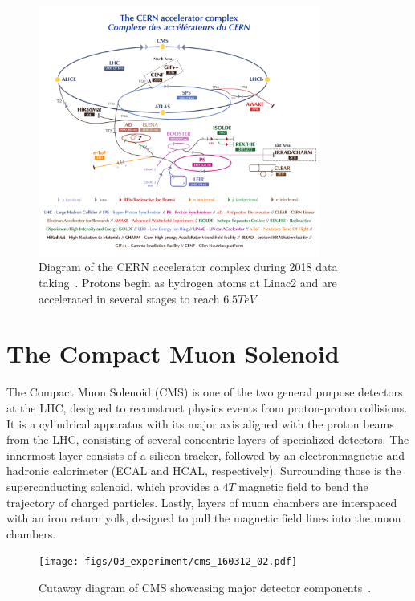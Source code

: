\begin{figure}[htbp]
	\centering
	\includegraphics[width=0.825\textwidth]{figs/03_experiment/CCC-v2018-print-v2.pdf}
	\caption[Diagram of the CERN accelerator complex during 2018 data taking. Protons begin as hydrogen atoms at Linac2 and collide at various detectors along the LHC at $\sqrt{s}=13\unit{TeV}$]
	{Diagram of the CERN accelerator complex during 2018 data taking~\cite{Mobs:2636343}. Protons begin as hydrogen atoms at Linac2 and are accelerated in several stages to reach $6.5\unit{TeV}$} 
	\label{fig:LHC}
\end{figure}

\section{The Compact Muon Solenoid} \label{sec:CMS}
The Compact Muon Solenoid (CMS) is one of the two general purpose detectors at the LHC, designed to reconstruct physics events from proton-proton collisions. It is a cylindrical apparatus with its major axis aligned with the proton beams from the LHC, consisting of several concentric layers of specialized detectors. The innermost layer consists of a silicon tracker, followed by an electronmagnetic and hadronic calorimeter (ECAL and HCAL, respectively). Surrounding those is the superconducting solenoid, which provides a $4\unit{T}$ magnetic field to bend the trajectory of charged particles. Lastly, layers of muon chambers are interspaced with an iron return yolk, designed to pull the magnetic field lines into the muon chambers.

\begin{figure}[htbp]
	\centering
	\texttt{[image: figs/03\_experiment/cms\_160312\_02.pdf]}
	\caption[Cutaway diagram of CMS showcasing major detector components~\cite{Sakuma:2665537}.]
			{Cutaway diagram of CMS showcasing major detector components~\cite{Sakuma:2665537}.}
	\label{fig:CMS}
\end{figure}

